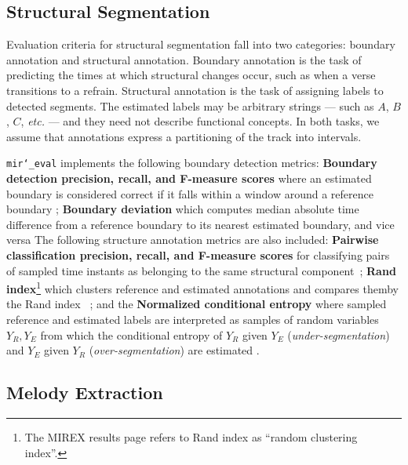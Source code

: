 \documentclass{article}
\def\etc{\emph{etc.}}
\def\mireval{\texttt{mir\char`_eval}}
\begin{document}
\subsection{Structural Segmentation}

Evaluation criteria for structural segmentation fall into two categories: boundary annotation and structural annotation.
Boundary annotation is the task of predicting the times at which structural changes occur, such as when a verse transitions to a refrain.
Structural annotation is the task of assigning labels to detected segments.
The estimated labels may be arbitrary strings --- such as $A$, $B$, $C$, \etc{} --- and they need not describe functional concepts.
In both tasks, we assume that annotations express a partitioning of the track into intervals.

\mireval{} implements the following boundary detection metrics:
\textbf{Boundary detection precision, recall, and F-measure scores} where an estimated boundary is considered correct if it falls within a window around a reference boundary \cite{turnbull2007supervised};
\textbf{Boundary deviation} which computes median absolute time difference from a reference boundary to its nearest estimated boundary, and vice versa \cite{turnbull2007supervised}
The following structure annotation metrics are also included:
\textbf{Pairwise classification precision, recall, and F-measure scores} for classifying pairs of sampled time instants as belonging to the same structural component~\cite{levy2008structural};
\textbf{Rand index}\footnote{The MIREX results page refers to Rand index as ``random clustering index''.} which clusters reference and estimated annotations and compares themby the Rand index ~\cite{rand1971objective};
and the \textbf{Normalized conditional entropy} where sampled reference and estimated labels are interpreted as samples of random variables $Y_R, Y_E$ from which the conditional entropy of $Y_R$ given $Y_E$ (\emph{under-segmentation}) and $Y_E$ given $Y_R$  (\emph{over-segmentation}) are estimated \cite{lukashevich2008towards}.

\subsection{Melody Extraction}
\end{document}
